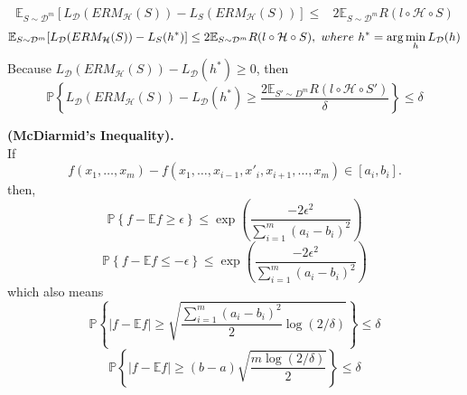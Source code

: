 \begin{theorem}
    \begin{align*}
        \mathbb{E} _{S \sim \mathcal{D}^m}[L_ \mathcal{D}(ERM_ \mathcal{H}(S)) - L_S(ERM_ \mathcal{H}(S))]
        \le& 2 \mathbb{E}_{S \sim \mathcal{D}^m } R( l \circ \mathcal{H} \circ S)
    \end{align*}
    \[
        \mathbb{E} _{S \sim \mathcal{D}^m}[L_ \mathcal{D}(ERM_ \mathcal{H}(S)) - L_S(h^*)]
        \le 2 \mathbb{E}_{S \sim \mathcal{D}^m } R( l \circ \mathcal{H} \circ S),
        \ where\ h^* = \arg\min_h L_\mathcal{D}(h)\\
    \]
    Because $ L_ \mathcal{D}(ERM_ \mathcal{H}(S)) - L_ \mathcal{D}(h^*) \ge 0 $, then
    \[
        \mathbb{P} \left\{ L_ \mathcal{D}(ERM_ \mathcal{H}(S)) - L_ \mathcal{D}(h^*) \ge 
        \frac{2 \mathbb{E}_{S' \sim D^m} R(l \circ \mathcal{H} \circ S')}{\delta} \right\} \le \delta
    \]
\end{theorem}
\begin{lemma}
    \textbf{(McDiarmid's Inequality).}\\
    If
    \[
        f(x_1, \ldots, x_m) - f(x_1, \ldots, x_{i-1}, x'_i, x_{i+1}, \ldots, x_m) \in [a_i, b_i].
    \]
    then,
    \[
        \mathbb{P} \left\{ f - \mathbb{E}f \ge \epsilon  \right\} \le \exp \left( \frac{-2\epsilon^2}{ \sum^{m}_{i=1} {(a_i - b_i)}^2}  \right)
    \]
    \[
        \mathbb{P} \left\{ f - \mathbb{E}f \le -\epsilon  \right\} \le \exp \left( \frac{-2\epsilon^2}{ \sum^{m}_{i=1} {(a_i - b_i)}^2}  \right)
    \]
    which also means
    \[
        \mathbb{P} \left\{ | f - \mathbb{E}f | \ge \sqrt{\frac{\sum^{m}_{i=1} {(a_i - b_i)}^2}{2} \log (2/\delta)} \right\} \le \delta
    \]
    \[
        \mathbb{P} \left\{ | f - \mathbb{E}f | \ge (b - a)\sqrt{\frac{m \log(2/\delta)}{2}} \right\} \le \delta
    \]
\end{lemma}

